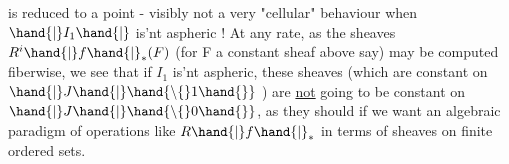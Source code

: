 
is reduced to a point  -  visibly not a very "cellular" behaviour when
$\hand{|}I_1\hand{|}$ is'nt aspheric !  At any rate,  as the sheaves 
$R^i\hand{|}f\hand{|}_*(F)$  (for F a constant sheaf above say) may be computed fiberwise,
we see that if $I_1$  is'nt aspheric,  these sheaves (which are constant
on $\hand{|}J\hand{|}\hand{\setminus\{}1\hand{\}}$ )  are \uline{not} going to be constant on  $\hand{|}J\hand{|}\hand{\setminus\{}0\hand{\}}$, as 
 they should if we want an algebraic paradigm of operations like
$R\hand{|}f\hand{|}_*$  in terms of sheaves on finite ordered sets.

